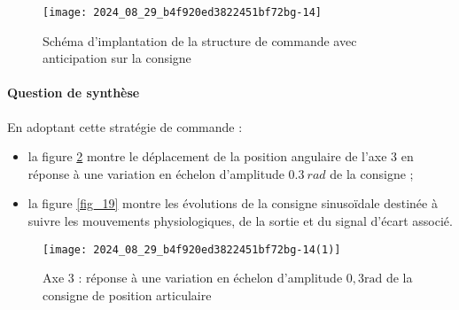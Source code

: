 \begin{figure}[!h]
\centering
\texttt{[image: 2024\_08\_29\_b4f920ed3822451bf72bg-14]}
\caption{\label{fig_17} Schéma d'implantation de la structure de commande avec anticipation sur la consigne}
\end{figure}


\paragraph*{Question de synthèse}

En adoptant cette stratégie de commande :
\begin{itemize}
  \item la figure \ref{fig_18} montre le déplacement de la position angulaire de l'axe 3 en réponse à une variation en échelon d'amplitude $\SI{0,3}{rad}$ de la consigne ;
  \item la figure \ref{fig_19} montre les évolutions de la consigne sinusoïdale destinée à suivre les mouvements physiologiques, de la sortie et du signal d'écart associé.
\end{itemize}

\begin{figure}[!h]
\centering
\texttt{[image: 2024\_08\_29\_b4f920ed3822451bf72bg-14(1)]}

\caption{\label{fig_18} Axe 3 : réponse à une variation en échelon d'amplitude $0,3 \mathrm{rad}$ de la consigne de position articulaire}
\end{figure}


